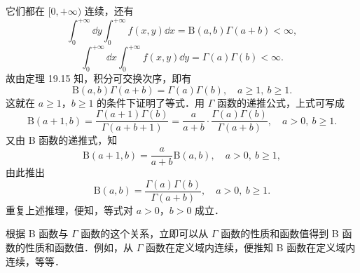 它们都在 $[0,+\infty)$ 连续，还有
\[
\int_{0}^{+\infty}\dd y\int_{0}^{+\infty}f(x,y)\dd x=\mathrm{B}(a,b)\Gamma(a+b)<\infty,
\]
\[
\int_{0}^{+\infty}\dd x\int_{0}^{+\infty}f(x,y)\dd y=\Gamma(a)\Gamma(b)<\infty.
\]
故由定理 19.15 知，积分可交换次序，即有
\[
\mathrm{B}(a,b)\Gamma(a+b)=\Gamma(a)\Gamma(b),\quad a\geqslant 1,\ b\geqslant 1.
\]
这就在 $a\geqslant 1$，$b\geqslant 1$ 的条件下证明了等式．用 $\Gamma$ 函数的递推公式，上式可写成
\[
\mathrm{B}(a+1,b)=\frac{\Gamma(a+1)\Gamma(b)}{\Gamma(a+b+1)}=\frac{a}{a+b}\cdot\frac{\Gamma(a)\Gamma(b)}{\Gamma(a+b)},\quad a>0,\ b\geqslant 1.
\]
又由 B 函数的递推式，知
\[
\mathrm{B}(a+1,b)=\frac{a}{a+b}\mathrm{B}(a,b),\quad a>0,\ b\geqslant 1,
\]
由此推出
\[
\mathrm{B}(a,b)=\frac{\Gamma(a)\Gamma(b)}{\Gamma(a+b)},\quad a>0,\ b\geqslant 1.
\]
重复上述推理，便知，等式对 $a>0$，$b>0$ 成立．

根据 B 函数与 $\Gamma$ 函数的这个关系，立即可以从 $\Gamma$ 函数的性质和函数值得到 B 函数的性质和函数值．例如，从 $\Gamma$ 函数在定义域内连续，便推知 B 函数在定义域内连续，等等．

